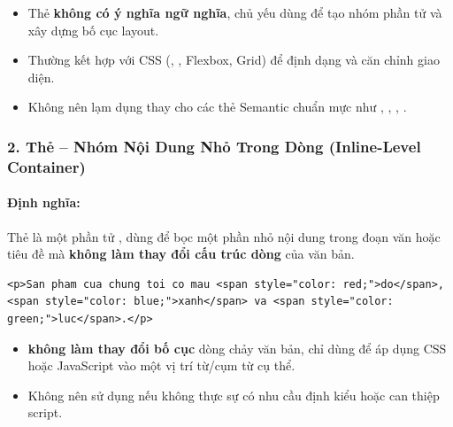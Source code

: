 \begin{noteBox}
\begin{itemize}[leftmargin=1.5em, itemsep=3pt, parsep=0pt]
    \item Thẻ  \textbf{không có ý nghĩa ngữ nghĩa}, chủ yếu dùng để tạo nhóm phần tử và xây dựng bố cục layout.
    \item Thường kết hợp với CSS (, , Flexbox, Grid) để định dạng và căn chỉnh giao diện.
    \item Không nên lạm dụng  thay cho các thẻ Semantic chuẩn mực như , , , .
\end{itemize}
\end{noteBox}

\subsubsection{2. Thẻ  -- Nhóm Nội Dung Nhỏ Trong Dòng (Inline-Level Container)}

\paragraph{Định nghĩa:}
Thẻ  là một phần tử , dùng để bọc một phần nhỏ nội dung trong đoạn văn hoặc tiêu đề mà \textbf{không làm thay đổi cấu trúc dòng} của văn bản.

\begin{codeWindow}
\begin{lstlisting}[language=HTML5]
<p>San pham cua chung toi co mau <span style="color: red;">do</span>, <span style="color: blue;">xanh</span> va <span style="color: green;">luc</span>.</p>
\end{lstlisting}
\end{codeWindow}

\begin{noteBox}
\begin{itemize}[leftmargin=1.5em, itemsep=3pt, parsep=0pt]
    \item {} \textbf{không làm thay đổi bố cục} dòng chảy văn bản, chỉ dùng để áp dụng CSS hoặc JavaScript vào một vị trí từ/cụm từ cụ thể.
    \item Không nên sử dụng  nếu không thực sự có nhu cầu định kiểu hoặc can thiệp script.
\end{itemize}
\end{noteBox}

